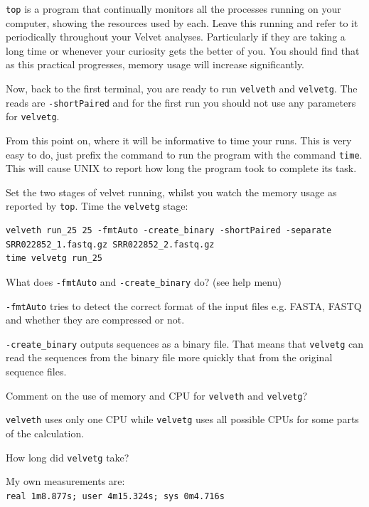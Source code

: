 \begin{note}
\texttt{top} is a program that continually monitors all the processes running on
your computer, showing the resources used by each. Leave this running and refer
to it periodically throughout your Velvet analyses. Particularly if they are
taking a long time or whenever your curiosity gets the better of you. You should
find that as this practical progresses, memory usage will increase
significantly.

Now, back to the first terminal, you are ready to run \texttt{velveth} and
\texttt{velvetg}. The reads are \texttt{-shortPaired} and for the
first run you should not use any parameters for \texttt{velvetg}.
\end{note}

\begin{information}
From this point on, where it will be informative to time
your runs. This is very easy to do, just prefix the command to run the program
with the command \texttt{time}. This will cause UNIX to report how long the program took
to complete its task.
\end{information}

\begin{steps}
Set the two stages of velvet running, whilst you watch the memory usage as
reported by \texttt{top}. Time the \texttt{velvetg} stage:
\begin{lstlisting}
velveth run_25 25 -fmtAuto -create_binary -shortPaired -separate SRR022852_1.fastq.gz SRR022852_2.fastq.gz
time velvetg run_25
\end{lstlisting}

\end{steps}

\begin{questions}
What does \texttt{-fmtAuto} and \texttt{-create\_binary} do? (see help menu)
\begin{answer}
\texttt{-fmtAuto} tries to detect the correct format of the input files e.g.
  FASTA, FASTQ and whether they are compressed or not.

\texttt{-create\_binary} outputs sequences as a binary file. That means that
  \texttt{velvetg} can read the sequences from the binary file more quickly that
  from the original sequence files.
\end{answer}

Comment on the use of memory and CPU for \texttt{velveth} and \texttt{velvetg}?
\begin{answer}
\texttt{velveth} uses only one CPU while \texttt{velvetg} uses all possible CPUs
for some parts of the calculation.
\end{answer}
 
How long did \texttt{velvetg} take?
\begin{answer}
My own measurements are:\\
\texttt{real    1m8.877s; user    4m15.324s; sys     0m4.716s}
\end{answer}

\end{questions}

